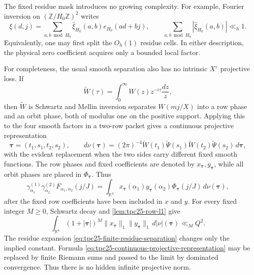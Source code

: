 The fixed residue mask introduces no growing complexity.  For example,
Fourier inversion on \((\mathbb Z/H_0\mathbb Z)^2\) writes
\begin{equation}
 \xi(d,j)=
 \sum_{a,b\bmod H_0}\widehat\xi_{H_0}(a,b)e_{H_0}(ad+bj),
 \qquad
 \sum_{a,b\bmod H_0}|\widehat\xi_{H_0}(a,b)|\ll_h1.
 \label{eq:tpc25-finite-residue-separation}
\end{equation}
Equivalently, one may first split the \(O_h(1)\) residue cells.  In
either description, the physical zero coefficient acquires only a
bounded local factor.

For completeness, the usual smooth separation also has no intrinsic
\(X^\varepsilon\) projective loss.  If
\begin{equation}
 \widetilde W(\tau)=
 \int_0^\infty W(z)z^{-i\tau}\frac{dz}{z},
 \label{eq:tpc25-log-Mellin-transform}
\end{equation}
then \(\widetilde W\) is Schwartz and Mellin inversion separates
\(W(mj/X)\) into a row phase and an orbit phase, both of modulus one
on the positive support.  Applying this to the four smooth factors in
a two-row packet gives a continuous projective representation
\[
 \boldsymbol\tau=(t_1,s_1,t_2,s_2),\qquad
 d\nu(\boldsymbol\tau)
 =(2\pi)^{-4}\widetilde W(t_1)\widetilde\Psi(s_1)
   \widetilde W(t_2)\widetilde\Psi(s_2)\,
   d\boldsymbol\tau,
\]
with the evident replacement when the two sides carry different fixed
smooth functions.  The row phases and fixed coefficients are denoted
by \(x_{\boldsymbol\tau},y_{\boldsymbol\tau}\), while all orbit phases
are placed in \(\Phi_{\boldsymbol\tau}\).  Thus
\begin{equation}
 \gamma_{\alpha_1}^{(1)}\gamma_{\alpha_2}^{(2)}
 F_{\alpha_1,\alpha_2}(j/J)
 =\int_{\mathbb R^4}
 x_{\boldsymbol\tau}(\alpha_1)
 y_{\boldsymbol\tau}(\alpha_2)
 \Phi_{\boldsymbol\tau}(j/J)\,
 d\nu(\boldsymbol\tau),
 \label{eq:tpc25-continuous-projective-representation}
\end{equation}
after the fixed row coefficients have been included in \(x\) and
\(y\).  For every fixed integer \(M\ge0\), Schwartz decay and
\cref{lem:tpc25-row-l1} give
\begin{equation}
 \int_{\mathbb R^4}(1+|\boldsymbol\tau|)^M
 \|x_{\boldsymbol\tau}\|_1
 \|y_{\boldsymbol\tau}\|_1\,d|\nu|(\boldsymbol\tau)
 \ll_M Q^2.
 \label{eq:tpc25-weighted-projective-mass}
\end{equation}
The residue expansion \eqref{eq:tpc25-finite-residue-separation}
changes only the implied constant.  Formula
\eqref{eq:tpc25-continuous-projective-representation} may be replaced
by finite Riemann sums and passed to the limit by dominated
convergence.  Thus there is no hidden infinite projective norm.

